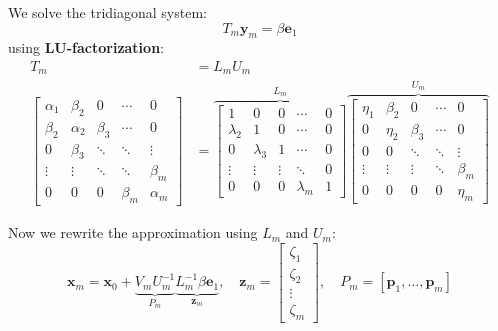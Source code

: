 \documentclass[../../main.tex]{subfiles}
\begin{document}
We solve the tridiagonal system:
\[
  T_m \mathbf{y}_m = \beta \mathbf{e}_1
\]
using \textbf{LU-factorization}:
\begin{align*}
  T_m                                                   & = L_m U_m \\
  \begin{bmatrix}
    \alpha_1 & \beta_2  & 0       & \cdots  & 0        \\
    \beta_2  & \alpha_2 & \beta_3 & \cdots  & 0        \\
    0        & \beta_3  & \ddots  & \ddots  & \vdots   \\
    \vdots   & \vdots   & \ddots  & \ddots  & \beta_m  \\
    0        & 0        & 0       & \beta_m & \alpha_m
  \end{bmatrix} & =
  \overbrace{
    \begin{bmatrix}
      1         & 0         & 0      & \cdots    & 0 \\
      \lambda_2 & 1         & 0      & \cdots    & 0 \\
      0         & \lambda_3 & 1      & \cdots    & 0 \\
      \vdots    & \vdots    & \vdots & \ddots    & 0 \\
      0         & 0         & 0      & \lambda_m & 1
    \end{bmatrix}
  }^{L_m}
  \overbrace{
    \begin{bmatrix}
      \eta_1 & \beta_2 & 0       & \cdots & 0       \\
      0      & \eta_2  & \beta_3 & \cdots & 0       \\
      0      & 0       & \ddots  & \ddots & \vdots  \\
      \vdots & \vdots  & \vdots  & \ddots & \beta_m \\
      0      & 0       & 0       & 0      & \eta_m
    \end{bmatrix}}^{U_m}
\end{align*}

Now we rewrite the approximation using $L_m$ and $U_m$:
\[
  \mathbf{x}_m = \mathbf{x}_0 + \underbrace{V_m U_m^{-1}}_{P_m} \underbrace{L_m^{-1} \beta \mathbf{e}_1}_{\mathbf{z}_m},
  \quad \mathbf{z}_m =
  \begin{bmatrix}
    \zeta_1 \\
    \zeta_2 \\
    \vdots  \\
    \zeta_m
  \end{bmatrix},
  \quad P_m = [\mathbf{p}_1, \ldots, \mathbf{p}_m]
\]
\end{document}
